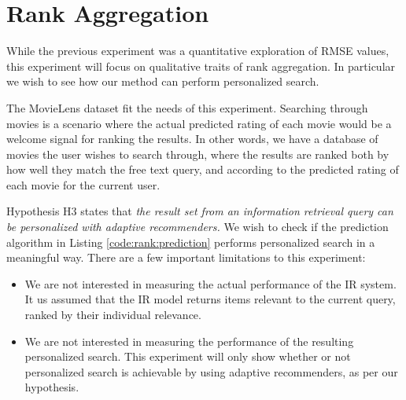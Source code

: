 \section{Rank Aggregation}


\afterpage{\clearpage}

While the previous experiment was a quantitative exploration of RMSE values,
this experiment will focus on qualitative traits of rank aggregation.
In particular we wish to see how our method can perform personalized search.

The MovieLens dataset fit the needs of this experiment.
Searching through movies is a scenario where the actual predicted
rating of each movie would be a welcome signal for ranking the results.
In other words, we have a database of movies the user wishes to search through,
where the results are ranked both by how well they match the free text query,
and according to the predicted rating of each movie for the current user.

Hypothesis H3 states that 
{
  \itshape
  the result set from an information retrieval query
  can be personalized with adaptive recommenders.
}
We wish to check if the prediction algorithm
in Listing \ref{code:rank:prediction} performs personalized search
in a meaningful way.
There are a few important limitations to this experiment:

\begin{itemize}
  \item 
    We are not interested in measuring the actual performance of the IR system.
    It us assumed that the IR model returns items relevant to the current query,
    ranked by their individual relevance.
  \item
    We are not interested in measuring the performance of the resulting personalized search.
    This experiment will only show whether or not personalized search is achievable
    by using adaptive recommenders, as per our hypothesis.
\end{itemize}

\begin{comment}
\begin{table}[b]
  \centering
  \begin{tabular*}{0.7\textwidth}{ l l l l }
    \toprule
      ~ & 
      \emph{query} &
      \emph{scores} &
      \emph{IR weight} \\
    \midrule
    
    1 &
    ["new york or washington"] &
    combined &
    $1.0$ \\

    2 &
    [star trek] &
    combined &
    $0.3$ \\

    3 &
    [paris] &
    ratings &
    $0.0$ \\

    4 &
    [1998] &
    ratings &
    $0.0$ \\

    \bottomrule 
  \end{tabular*}
  \caption[List of Ranking Experiments]{List of ranking tests in this section.}
  \label{table:experiments:rank}
\end{table}
\end{comment}

